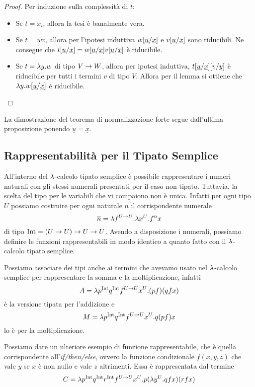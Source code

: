 \documentclass[]{marticle}
\begin{document}
\begin{proof}
    Per induzione sulla complessit\`a di $t$:
    \begin{itemize}
        \item Se $t=x_i$, allora la tesi \`e banalmente vera.
        \item Se $t=wv$, allora per l'ipotesi induttiva $w[\underline{u}/\underline{x}]$ e $v[\underline{u}/\underline{x}]$ sono
            riducibili. Ne consegue che $t[\underline{u}/\underline{x}] =
            w[\underline{u}/\underline{x}] v[\underline{u}/\underline{x}]$ \`e riducibile.
        \item Se $t=\lambda y. w$ di tipo $V\rightarrow W$, allora per ipotesi induttiva,
            $t[\underline{u}/\underline{x}] [v/y]$ \`e riducibile per
            tutti i termini $v$ di tipo $V$. Allora per il lemma  si ottiene che $\lambda y. w[\underline{u}/\underline{x}]$
            \`e riducibile.
    \end{itemize}
\end{proof}

La dimostrazione del teorema di normalizzazione forte segue dall'ultima
proposizione ponendo $\underline{u} = \underline{x}$.


\subsection{Rappresentabilit\`a per il Tipato Semplice}

All'interno del $\lambda$-calcolo tipato semplice \`e possibile rappresentare i
numeri naturali con gli stessi numerali presentati per il caso non tipato.
Tuttavia, la scelta del tipo per le variabili che vi compaiono non \`e unica.
Infatti per ogni tipo $U$ possiamo costruire per ogni naturale $n$ il
corrispondente numerale
\[
    \overline{n} = \lambda f^{U\rightarrow U} .\lambda x^U. f^n x
\]
di tipo $\text{Int} = (U\rightarrow U) \rightarrow U \rightarrow U$. Avendo a disposizione i numerali,
possiamo definire le funzioni rappresentabili in modo identico a quanto fatto
con il $\lambda$-calcolo tipato semplice.

Possiamo associare dei tipi anche ai termini che avevamo usato nel $\lambda$-calcolo
semplice per rappresentare la somma e la moltiplicazione, infatti 
\[
    A = \lambda p^{\text{Int}} q^{\text{Int}} f^{U\rightarrow U}x^U. (pf)(qfx)
\]
\`e la versione tipata per l'addizione e 
\[
    M = \lambda p^{\text{Int}} q^{\text{Int}} f^{U\rightarrow U}x^U. q (p f) x
\]
lo \`e per la moltiplicazione.

Possiamo dare un ulteriore esempio di funzione rappresentabile, che \`e quella
corrispondente all'\textit{if/then/else}, ovvero la funzione condizionale
$f(x,y,z)$ che vale $y$ se $x$ \`e non nullo e vale $z$ altrimenti. Essa \`e
rappresentata dal termine
\[
    C = \lambda p^{\text{Int}} q^{\text{Int}} r^{\text{Int}} f^{U\rightarrow U} x^U. p (\lambda y^U. qfx)(rfx)
\]
\end{document}

